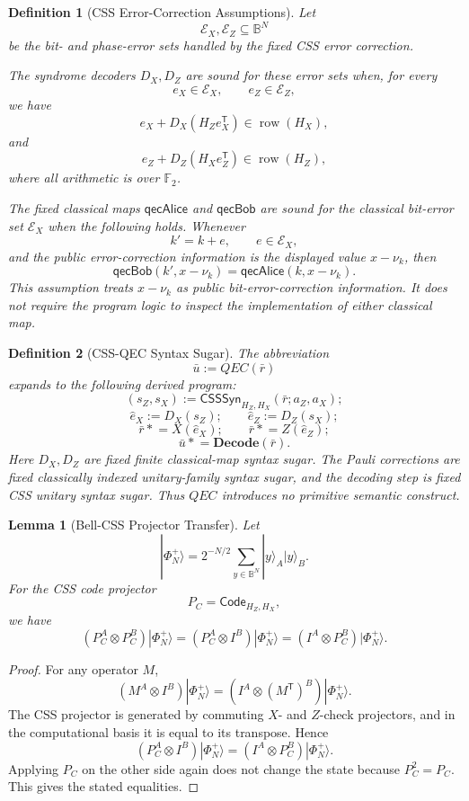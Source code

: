 \documentclass[acmsmall,screen,review,anonymous,nonacm]{acmart}
\newtheorem{definition}{Definition}[section]
\theoremstyle{defn_style}
\newtheorem{lem}{Lemma}[section]
\newcommand{\asteq}{\mathrel{*}=}
\begin{document}
\begin{definition}[CSS Error-Correction Assumptions]
\label{def:css-ec-assumptions}
Let
\[
\mathcal E_X,\mathcal E_Z\subseteq\mathbb B^N
\]
be the bit- and phase-error sets handled by the fixed CSS error correction.

The syndrome decoders \(D_X,D_Z\) are sound for these error sets when, for
every
\[
e_X\in\mathcal E_X,
\qquad
e_Z\in\mathcal E_Z,
\]
we have
\[
e_X+D_X(H_Ze_X^{\mathsf T})\in \operatorname{row}(H_X),
\]
and
\[
e_Z+D_Z(H_Xe_Z^{\mathsf T})\in \operatorname{row}(H_Z),
\]
where all arithmetic is over \(\mathbb F_2\).

The fixed classical maps \(\mathsf{qecAlice}\) and
\(\mathsf{qecBob}\) are sound for the classical bit-error set
\(\mathcal E_X\) when the following holds. Whenever
\[
k'=k+e,
\qquad
e\in\mathcal E_X,
\]
and the public error-correction information is the displayed value
\(x-\nu_k\), then
\[
\mathsf{qecBob}(k',x-\nu_k)
=
\mathsf{qecAlice}(k,x-\nu_k).
\]
This assumption treats \(x-\nu_k\) as public bit-error-correction information.
It does not require the program logic to inspect the implementation of either
classical map.
\end{definition}

\begin{definition}[CSS-QEC Syntax Sugar]
\label{def:css-qec-sugar}
The abbreviation
\[
\bar u := QEC(\bar r)
\]
expands to the following derived program:
\[
(s_Z,s_X):=
\mathsf{CSSSyn}_{H_Z,H_X}(\bar r;a_Z,a_X);
\]
\[
\hat e_X:=D_X(s_Z);
\qquad
\hat e_Z:=D_Z(s_X);
\]
\[
\bar r\asteq X(\hat e_X);
\qquad
\bar r\asteq Z(\hat e_Z);
\]
\[
\bar u\asteq \mathbf{Decode}(\bar r).
\]
Here \(D_X,D_Z\) are fixed finite classical-map syntax sugar. The Pauli
corrections are fixed classically indexed unitary-family syntax sugar, and the
decoding step is fixed CSS unitary syntax sugar. Thus \(QEC\) introduces no
primitive semantic construct.
\end{definition}

\begin{lem}[Bell-CSS Projector Transfer]
\label{lem:bell-css-projector-transfer}
Let
\[
|\Phi_N^+\rangle
=
2^{-N/2}
\sum_{y\in\mathbb B^N}
|y\rangle_A|y\rangle_B .
\]
For the CSS code projector
\[
P_C=\mathsf{Code}_{H_Z,H_X},
\]
we have
\[
(P_C^A\otimes P_C^B)|\Phi_N^+\rangle
=
(P_C^A\otimes I^B)|\Phi_N^+\rangle
=
(I^A\otimes P_C^B)|\Phi_N^+\rangle .
\]
\end{lem}

\begin{proof}
For any operator \(M\),
\[
(M^A\otimes I^B)|\Phi_N^+\rangle
=
(I^A\otimes (M^{\mathsf T})^B)|\Phi_N^+\rangle .
\]
The CSS projector is generated by commuting \(X\)- and \(Z\)-check projectors,
and in the computational basis it is equal to its transpose. Hence
\[
(P_C^A\otimes I^B)|\Phi_N^+\rangle
=
(I^A\otimes P_C^B)|\Phi_N^+\rangle .
\]
Applying \(P_C\) on the other side again does not change the state because
\(P_C^2=P_C\). This gives the stated equalities.
\end{proof}
\end{document}
